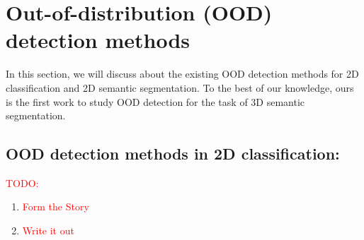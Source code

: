     
    
    \section{Out-of-distribution (OOD) detection methods}
    In this section, we will discuss about the existing OOD detection methods for 2D classification and 2D semantic segmentation.
    To the best of our knowledge, ours is the first work to study OOD detection for the task of 3D semantic segmentation.
    \subsection{OOD detection methods in 2D classification:}
    
    \textcolor{red}{TODO:}
    \begin{enumerate}
        \item \textcolor{red}{Form the Story}
        \item \textcolor{red}{Write it out}
    \end{enumerate}

